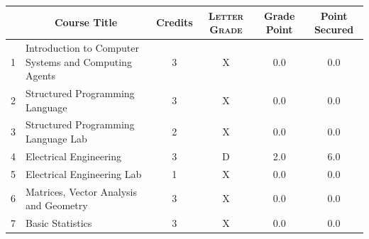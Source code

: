 \documentclass[11pt]{article}
\newcommand*{\numtwo}[1]{\pgfmathprintnumber[
                    fixed, precision=2, fixed zerofill=true]{#1}}
\begin{document}
                \begin{center}
                    \renewcommand{\arraystretch}{1.08}
                    
                \begin{tabular}{|c|l|c|>{\scshape}c|c|c|}
                \hline  \rule[-1ex]{0pt}{3.5ex} {\centering{\bf Course Code}} &  \multicolumn{1}{c|}{\textbf{Course Title}}  & {\bf Credits} & {\bf Letter Grade} & {\bf Grade Point} & {\bf Point Secured}  \\ 
                \hline   1 &  Introduction to Computer Systems and Computing Agents		 & 3 & X & 0.0 & 0.0 \\ %
                \hline   2 &  Structured Programming Language		 & 3 & X & 0.0 & 0.0 \\ %
                \hline   3 &  Structured Programming Language Lab		 & 2 & X & 0.0 & 0.0 \\ %
                \hline   4 &  Electrical Engineering		 & 3 & D & 2.0 & 6.0 \\ %
                \hline   5 &  Electrical Engineering Lab		 & 1 & X & 0.0 & 0.0 \\ %
                \hline   6 &  Matrices, Vector Analysis and Geometry		 & 3 & X & 0.0 & 0.0 \\ %
                \hline   7 &  Basic Statistics		 & 3 & X & 0.0 & 0.0 \\ %

\hline                %
                \end{tabular}
                \end{center}
                \renewcommand{\arraystretch}{1.03}
\end{document}
